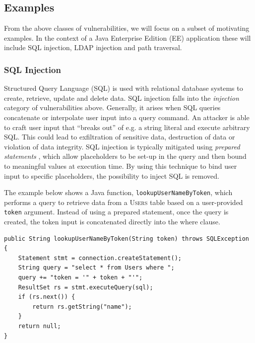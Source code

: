 \documentclass[a4paper,openany,12pt]{book}
\begin{document}
\subsection{Examples}

From the above classes of vulnerabilities, we will focus on a subset of motivating examples.
In the context of a Java Enterprise Edition (EE) application these will include SQL injection, LDAP injection and
path traversal.

\subsubsection{SQL Injection}
\label{ex:sqli}

Structured Query Language (SQL) is used with relational database systems to create, retrieve, update and delete data.
SQL injection falls into the \emph{injection} category of vulnerabilities above.
Generally, it arises when SQL queries concatenate or interpolate user input into a query command.
An attacker is able to craft user input that ``breaks out'' of e.g. a string literal and execute arbitrary SQL.
This could lead to exfiltration of sensitive data, destruction of data or violation of data integrity.
SQL injection is typically mitigated using \emph{prepared statements} \citep{stuttard2011web}, which allow placeholders to be set-up in the
query and then bound to meaningful values at execution time.
By using this technique to bind user input to specific placeholders, the possibility to inject SQL is removed.

The example below shows a Java function, \texttt{lookupUserNameByToken}, which performs a query to retrieve data from
a \textsc{Users} table based on a user-provided \texttt{token} argument.
Instead of using a prepared statement, once the query is created, the token input is concatenated directly into the
\textcolor{id7-aubergine}{where} clause.

\newsavebox\myv

\begin{lrbox}{\myv}\begin{minipage}{\textwidth}
\begin{verbatim}
public String lookupUserNameByToken(String token) throws SQLException {
    Statement stmt = connection.createStatement();
    String query = "select * from Users where ";
    query += "token = '" + token + "'";
    ResultSet rs = stmt.executeQuery(sql);
    if (rs.next()) {
        return rs.getString("name");
    }
    return null;
}
\end{verbatim}
\end{minipage}\end{lrbox}
\end{document}

